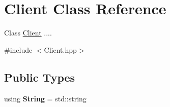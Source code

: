 \hypertarget{classClient}{}\section{Client Class Reference}
\label{classClient}


Class \hyperlink{classClient}{Client} ....  




{\ttfamily \#include $<$Client.\+hpp$>$}

\subsection*{Public Types}
\begin{DoxyCompactItemize}
\item 
using {\bfseries String} = std\+::string\hypertarget{classClient_a2a46192658d9ba7bb6f9cfa41ce56d11}{}\label{classClient_a2a46192658d9ba7bb6f9cfa41ce56d11}

\end{DoxyCompactItemize}
